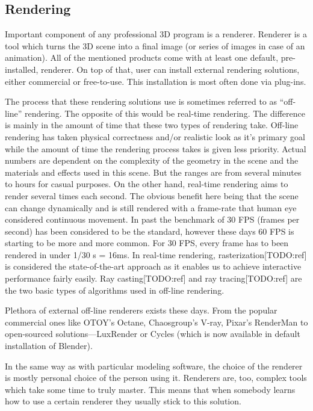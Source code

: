 \documentclass[
  digital, %
  table,   %
  nolof,     %
  nolot,     %
]{fithesis3}
\begin{document}
\subsection{Rendering}
Important component of any professional 3D program is a renderer. Renderer is a tool which turns the 3D scene into a final image (or series of images in case of an animation). All of the mentioned products come with at least one default, pre-installed, renderer. On top of that, user can install external rendering solutions, either commercial or free-to-use. This installation is most often done via plug-ins.

The process that these rendering solutions use is sometimes referred to as ``off-line'' rendering. The opposite of this would be real-time rendering. The difference is mainly in the amount of time that these two types of rendering take. Off-line rendering has taken physical correctness and/or realistic look as it's primary goal while the amount of  time the rendering process takes is given less priority. Actual numbers are dependent on the complexity of the geometry in the scene and the materials and effects used in this scene. But the ranges are from several minutes to hours for casual purposes. On the other hand, real-time rendering aims to render several times each second. The obvious benefit here being that the scene can change dynamically and is still rendered with a frame-rate that human eye considered continuous movement. In past the benchmark of 30 FPS (frames per second) has been considered to be the standard, however these days 60 FPS is starting to be more and more common. For 30 FPS, every frame has to been rendered in under 1/30 s = 16ms. In real-time rendering, rasterization[TODO:ref] is considered the state-of-the-art approach as it enables us to achieve interactive performance fairly easily.  Ray casting[TODO:ref] and ray tracing[TODO:ref] are the two basic types of algorithms used in off-line rendering.

Plethora of external off-line renderers exists these days. From the popular commercial ones like OTOY's Octane, Chaosgroup's V-ray, Pixar's RenderMan to open-sourced solutions—LuxRender or Cycles (which is now available in default installation of Blender).

In the same way as with particular modeling software, the choice of the renderer is mostly personal choice of the person using it. Renderers are, too, complex tools  which take some time to truly master. This means that when somebody learns how to use a certain renderer they usually stick to this solution.
\end{document}
